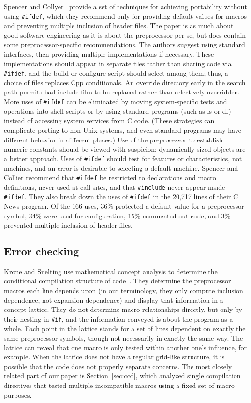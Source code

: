 \documentclass[10pt]{article}
\begin{document}
Spencer and Collyer~\cite{SpencerC92} provide a set of techniques for
achieving portability without using \texttt{\#ifdef}, which they recommend
only for providing default values for macros and preventing multiple
inclusion of header files.  The paper is as much about good software
engineering as it is about the preprocessor per se, but does
contain some preprocessor-specific recommendations.  The authors suggest using
standard interfaces, then providing multiple implementations if necessary.
These implementations should appear in separate files rather than sharing
code via {\tt \#ifdef}, and the build or configure script should select
among them; thus, a choice of files replaces Cpp conditionals.  An override
directory early in the search path permits bad include files to be replaced
rather than selectively overridden.  More uses of {\tt \#ifdef} can be
eliminated by moving system-specific tests and operations into shell
scripts or by using standard programs (such as {\sf ls} or {\sf df})
instead of accessing system services from C code.  (These strategies can
complicate porting to non-Unix systems, and even standard programs may have
different behavior in different places.)  Use of the preprocessor to
establish numeric constants should be viewed with suspicion;
dynamically-sized objects are a better approach.  Uses of {\tt \#ifdef}
should test for features or characteristics, not machines, and an error is
desirable to selecting a default machine.  Spencer and Collier recommend
that {\tt \#ifdef} be restricted to declarations and macro definitions,
never used at call sites, and that {\tt \#include} never appear inside {\tt
\#ifdef}.  They also break down the uses of \texttt{\#ifdef}
in the 20,717 lines of their C News program.  Of the 166 uses, 36\% protected a default
value for a preprocessor symbol, 34\% were used for configuration, 15\%
commented out code, and 3\% prevented multiple inclusion of header files.


\subsection{Error checking}

Krone and Snelting use mathematical concept analysis to determine the
conditional compilation structure of code~\cite{Krone94}.  They determine
the preprocessor macros each line depends upon (in our terminology, they
only compute inclusion dependence, not expansion dependence) and display
that information in a concept lattice.  They do not determine macro
relationships directly, but only by their nesting in {\tt \#if}, and
the information conveyed is about the program as a whole.  Each point in
the lattice stands for a set of lines dependent on exactly the same
preprocessor symbols, though not necessarily in exactly the same way.  The
lattice can reveal that one macro is only tested within another one's
influence, for example.  When the lattice does not have a regular grid-like
structure, it is possible that the code does not properly separate
concerns.  The most closely related part of our paper is
Section~\ref{sec:ccd}, which analyzed single compilation directives that
tested multiple incompatible macros using a fixed set of macro purposes.
\end{document}
